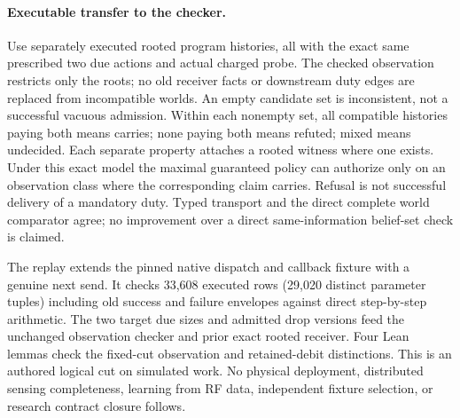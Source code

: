 \documentclass{article}
\begin{document}
\paragraph{Executable transfer to the checker.}
Use separately executed rooted program histories, all with the exact
same prescribed two due actions and actual charged probe.
The checked observation restricts only the roots; no old receiver
facts or downstream duty edges are replaced from incompatible worlds.
An empty candidate set is inconsistent, not a successful vacuous
admission. Within each nonempty set, all compatible histories paying
both means carries; none paying both means refuted; mixed means
undecided. Each separate property attaches a rooted witness where
one exists. Under this exact model the maximal guaranteed policy
can authorize only on an observation class where the corresponding
claim carries. Refusal is not successful delivery of a mandatory
duty. Typed transport and the direct complete world comparator agree;
no improvement over a direct same-information belief-set check is
claimed.

The replay extends the pinned native dispatch and callback fixture
with a genuine next send. It checks 33,608 executed rows (29,020
distinct parameter tuples) including old success and failure
envelopes against direct step-by-step arithmetic. The two
target due sizes and admitted drop versions feed the unchanged
observation checker and prior exact rooted receiver. Four Lean
lemmas check the fixed-cut observation and retained-debit
distinctions. This is an authored logical cut on simulated work.
No physical deployment, distributed sensing completeness, learning
from RF data, independent fixture selection, or research contract
closure follows.
\end{document}
